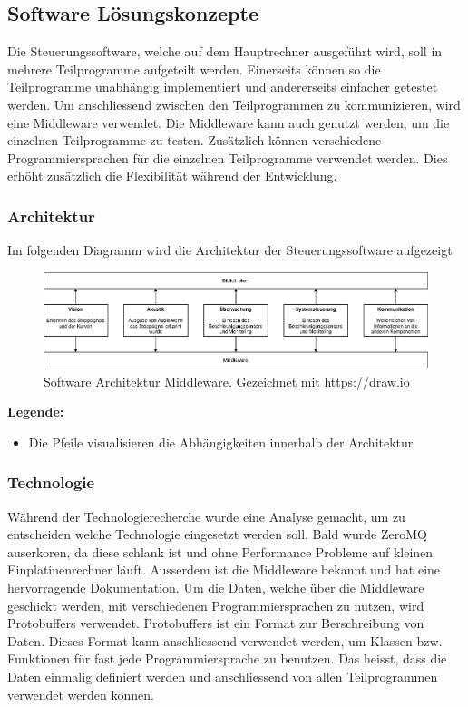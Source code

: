 \documentclass[../../main.tex]{subfiles}
\begin{document}
\subsection{Software Lösungskonzepte}
Die Steuerungssoftware, welche auf dem Hauptrechner ausgeführt wird, soll in mehrere Teilprogramme aufgeteilt werden.
Einerseits können so die Teilprogramme unabhängig implementiert und andererseits einfacher getestet werden.
Um anschliessend zwischen den Teilprogrammen zu kommunizieren, wird eine Middleware verwendet. Die Middleware kann auch genutzt werden,
um die einzelnen Teilprogramme zu testen. Zusätzlich können verschiedene Programmiersprachen für die einzelnen Teilprogramme verwendet werden. 
Dies erhöht zusätzlich die Flexibilität während der Entwicklung.

\subsubsection{Architektur}
Im folgenden Diagramm wird die Architektur der Steuerungssoftware aufgezeigt
\begin{figure}[H] %
    \centering
    \includegraphics[width=1.0\textwidth]{drawings/ArchitekturDiagramm/SW_Architektur_Middleware.png}
    \caption {Software Architektur Middleware. Gezeichnet mit https://draw.io}
\end{figure}

\textbf{Legende:}
\begin{itemize}
    \item Die Pfeile visualisieren die Abhängigkeiten innerhalb der Architektur
\end{itemize}

\subsubsection{Technologie}
Während der Technologierecherche wurde eine Analyse gemacht, um zu entscheiden welche Technologie eingesetzt werden soll. Bald wurde ZeroMQ
auserkoren, da diese schlank ist und ohne Performance Probleme auf kleinen Einplatinenrechner läuft. Ausserdem ist die Middleware bekannt
und hat eine hervorragende Dokumentation. Um die Daten, welche über die Middleware geschickt werden, mit verschiedenen Programmiersprachen zu
nutzen, wird Protobuffers verwendet. Protobuffers ist ein Format zur Berschreibung von Daten. Dieses Format kann anschliessend verwendet werden, um
Klassen bzw. Funktionen für fast jede Programmiersprache zu benutzen. Das heisst, dass die Daten einmalig definiert werden und anschliessend von
allen Teilprogrammen verwendet werden können.
\end{document}
